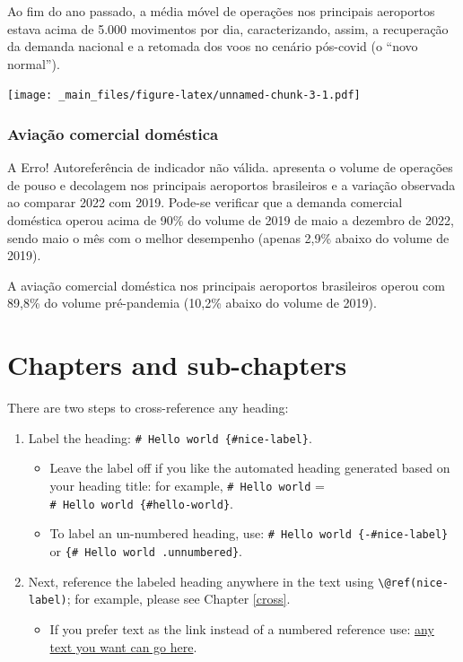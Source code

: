\documentclass[
]{book}
\providecommand{\tightlist}{%
  \setlength{\itemsep}{0pt}\setlength{\parskip}{0pt}}
\theoremstyle{definition}
\theoremstyle{definition}
\theoremstyle{definition}
\theoremstyle{definition}
\theoremstyle{remark}
\begin{document}
Ao fim do ano passado, a média móvel de operações nos principais aeroportos estava acima de 5.000 movimentos por dia, caracterizando, assim, a recuperação da demanda nacional e a retomada dos voos no cenário pós-covid (o ``novo normal'').

\texttt{[image: \_main\_files/figure-latex/unnamed-chunk-3-1.pdf]}

\hypertarget{aviauxe7uxe3o-comercial-domuxe9stica}{%
\subsubsection{Aviação comercial doméstica}\label{aviauxe7uxe3o-comercial-domuxe9stica}}

A Erro! Autoreferência de indicador não válida. apresenta o volume de operações de pouso e decolagem nos principais aeroportos brasileiros e a variação observada ao comparar 2022 com 2019. Pode-se verificar que a demanda comercial doméstica operou acima de 90\% do volume de 2019 de maio a dezembro de 2022, sendo maio o mês com o melhor desempenho (apenas 2,9\% abaixo do volume de 2019).

A aviação comercial doméstica nos principais aeroportos brasileiros operou com 89,8\% do volume pré-pandemia (10,2\% abaixo do volume de 2019).

\hypertarget{chapters-and-sub-chapters}{%
\section{Chapters and sub-chapters}\label{chapters-and-sub-chapters}}

There are two steps to cross-reference any heading:

\begin{enumerate}
\def\labelenumi{\arabic{enumi}.}
\tightlist
\item
  Label the heading: \texttt{\#\ Hello\ world\ \{\#nice-label\}}.

  \begin{itemize}
  \tightlist
  \item
    Leave the label off if you like the automated heading generated based on your heading title: for example, \texttt{\#\ Hello\ world} = \texttt{\#\ Hello\ world\ \{\#hello-world\}}.
  \item
    To label an un-numbered heading, use: \texttt{\#\ Hello\ world\ \{-\#nice-label\}} or \texttt{\{\#\ Hello\ world\ .unnumbered\}}.
  \end{itemize}
\item
  Next, reference the labeled heading anywhere in the text using \texttt{\textbackslash{}@ref(nice-label)}; for example, please see Chapter \ref{cross}.

  \begin{itemize}
  \tightlist
  \item
    If you prefer text as the link instead of a numbered reference use: \protect\hyperlink{cross}{any text you want can go here}.
  \end{itemize}
\end{enumerate}
\end{document}
